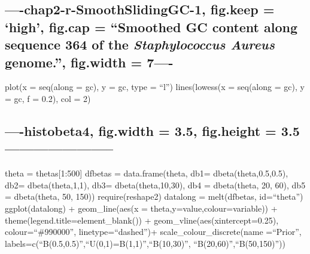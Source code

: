 \documentclass[]{article}
\begin{document}
\subsection{\texorpdfstring{----chap2-r-SmoothSlidingGC-1, fig.keep =
`high', fig.cap = ``Smoothed GC content along sequence 364 of the
\emph{Staphylococcus Aureus} genome.'', fig.width =
7----}{----chap2-r-SmoothSlidingGC-1, fig.keep = high, fig.cap = Smoothed GC content along sequence 364 of the Staphylococcus Aureus genome., fig.width = 7----}}\label{chap2-r-smoothslidinggc-1-fig.keep-high-fig.cap-smoothed-gc-content-along-sequence-364-of-the-staphylococcus-aureus-genome.-fig.width-7-}

plot(x = seq(along = gc), y = gc, type = ``l'') lines(lowess(x =
seq(along = gc), y = gc, f = 0.2), col = 2)

\subsection{----histobeta4, fig.width = 3.5, fig.height =
3.5-----------------------}\label{histobeta4-fig.width-3.5-fig.height-3.5}

theta = thetas{[}1:500{]} dfbetas = data.frame(theta, db1=
dbeta(theta,0.5,0.5), db2= dbeta(theta,1,1), db3= dbeta(theta,10,30),
db4 = dbeta(theta, 20, 60), db5 = dbeta(theta, 50, 150))
require(reshape2) datalong = melt(dfbetas, id=``theta'')
ggplot(datalong) + geom\_line(aes(x = theta,y=value,colour=variable)) +
theme(legend.title=element\_blank()) + geom\_vline(aes(xintercept=0.25),
colour=``\#990000'', linetype=``dashed'')+ scale\_colour\_discrete(name
=``Prior'', labels=c(``B(0.5,0.5)'',``U(0,1)=B(1,1)'',``B(10,30)'',
``B(20,60)'',``B(50,150)''))
\end{document}
